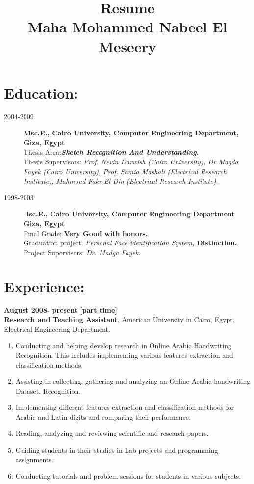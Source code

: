 \documentclass{article}
\title { Resume \\ Maha Mohammed Nabeel El Meseery}
\date{}
\begin{document}
\maketitle

 \section*{Education:}
  \begin{description}
 \item [2004-2009]  \textbf{ Msc.E., Cairo University, Computer Engineering Department, Giza, Egypt}\\
 Thesis Area:\textbf{\textit{Sketch Recognition And Understanding}.}\\
 Thesis Supervisors: \textit{Prof. Nevin Darwish (Cairo University), Dr Magda
 Fayek (Cairo University), Prof. Samia Mashali (Electrical Research Institute),
 Mahmoud Fakr El Din (Electrical Research Institute).}
 \item[1998-2003]  \textbf{ Bsc.E., Cairo University, Computer Engineering Department Giza, Egypt}\\
  Final Grade: \textbf{Very Good with honors.}\\
  Graduation project: \textit{Personal Face identification System,} \textbf{Distinction.}\\
  Project Supervisors: \textit{Dr. Madga Fayek.}

  \end{description}

 \section*{Experience:}
 \textbf{August 2008- present   [part time]}\\
 \textbf{Research and Teaching Assistant}, American University in Cairo, Egypt,
 Electrical Engineering Department.

 \begin{enumerate}
   \item Conducting and helping develop research in Online Arabic Handwriting
   Recognition. This includes implementing various features extraction and classification methods.
   \item Assisting in collecting, gathering and analyzing an Online Arabic
   handwriting Dataset.
   Recognition.
 \item Implementing different features extraction and classification methods for Arabic and Latin digits and comparing their performance.
 \item Reading, analyzing and reviewing scientific and research papers.
 \item Guiding students in their studies in Lab projects and programming
 assignments.
 \item Conducting tutorials and problem sessions for students in various
 subjects.
\end{enumerate}
\end{document}
